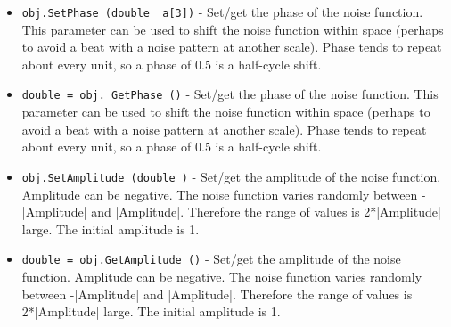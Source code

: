\begin{itemize}
\item  \verb|obj.SetPhase (double  a[3])| -  Set/get the phase of the noise function.  This parameter can be used to
 shift the noise function within space (perhaps to avoid a beat with a
 noise pattern at another scale).  Phase tends to repeat about every
 unit, so a phase of 0.5 is a half-cycle shift.

\item  \verb|double = obj. GetPhase ()| -  Set/get the phase of the noise function.  This parameter can be used to
 shift the noise function within space (perhaps to avoid a beat with a
 noise pattern at another scale).  Phase tends to repeat about every
 unit, so a phase of 0.5 is a half-cycle shift.

\item  \verb|obj.SetAmplitude (double )| -  Set/get the amplitude of the noise function. Amplitude can be negative.
 The noise function varies randomly between -|Amplitude| and |Amplitude|.
 Therefore the range of values is 2*|Amplitude| large.
 The initial amplitude is 1.

\item  \verb|double = obj.GetAmplitude ()| -  Set/get the amplitude of the noise function. Amplitude can be negative.
 The noise function varies randomly between -|Amplitude| and |Amplitude|.
 Therefore the range of values is 2*|Amplitude| large.
 The initial amplitude is 1.

\end{itemize}
